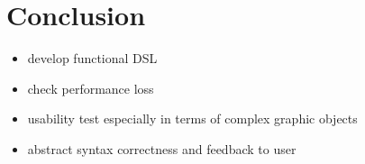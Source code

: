 \chapter{Conclusion}



\begin{itemize}
  \item develop functional DSL
  \item check performance loss
  \item usability test especially in terms of complex graphic objects
  \item abstract syntax correctness and feedback to user
\end{itemize}

